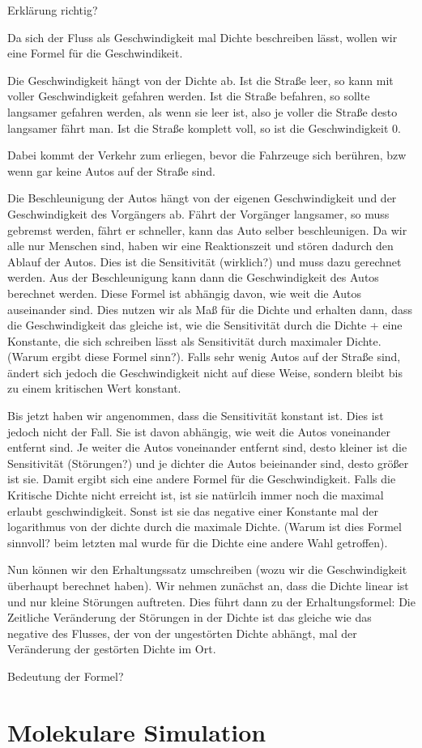 \documentclass[]{article}
\begin{document}
Erklärung richtig? 

Da sich der Fluss als Geschwindigkeit mal Dichte beschreiben lässt, wollen wir eine Formel für die Geschwindikeit. 

Die Geschwindigkeit hängt von der Dichte ab. Ist die Straße leer, so kann mit voller Geschwindigkeit gefahren werden. Ist die Straße befahren, so sollte langsamer gefahren werden, als wenn sie leer ist, also je voller die Straße desto langsamer fährt man. Ist die Straße komplett voll, so ist die Geschwindigkeit 0. 

Dabei kommt der Verkehr zum erliegen, bevor die Fahrzeuge sich berühren, bzw wenn gar keine Autos auf der Straße sind. 

Die Beschleunigung der Autos hängt von der eigenen Geschwindigkeit und der Geschwindigkeit des Vorgängers ab. Fährt der Vorgänger langsamer, so muss gebremst werden, fährt er schneller, kann das Auto selber beschleunigen. Da wir alle nur Menschen sind, haben wir eine Reaktionszeit und stören dadurch den Ablauf der Autos. Dies ist die Sensitivität (wirklich?) und muss dazu gerechnet werden. Aus der Beschleunigung kann dann die Geschwindigkeit des Autos berechnet werden. Diese Formel ist abhängig davon, wie weit die Autos auseinander sind. Dies nutzen wir als Maß für die Dichte und erhalten dann, dass die Geschwindigkeit das gleiche ist, wie die Sensitivität durch die Dichte + eine Konstante, die sich schreiben lässt als Sensitivität durch maximaler Dichte. (Warum ergibt diese Formel sinn?). Falls sehr wenig Autos auf der Straße sind, ändert sich jedoch die Geschwindigkeit nicht auf diese Weise, sondern bleibt bis zu einem kritischen Wert konstant. 

Bis jetzt haben wir angenommen, dass die Sensitivität konstant ist. Dies ist jedoch nicht der Fall. Sie ist davon abhängig, wie weit die Autos voneinander entfernt sind. Je weiter die Autos voneinander entfernt sind, desto kleiner ist die Sensitivität (Störungen?) und je dichter die Autos beieinander sind, desto größer ist sie. Damit ergibt sich eine andere Formel für die Geschwindigkeit. Falls die Kritische Dichte nicht erreicht ist, ist sie natürlcih immer noch die maximal erlaubt geschwindigkeit. Sonst ist sie das negative einer Konstante mal der logarithmus von der dichte durch die maximale Dichte.  (Warum ist dies Formel sinnvoll? beim letzten mal wurde für die Dichte eine andere Wahl getroffen). 

Nun können wir den Erhaltungssatz umschreiben (wozu wir die Geschwindigkeit überhaupt berechnet haben). Wir nehmen zunächst an, dass die Dichte linear ist und nur kleine Störungen auftreten. Dies führt dann zu der Erhaltungsformel: Die Zeitliche Veränderung der Störungen in der Dichte ist das gleiche wie das negative des Flusses, der von der ungestörten Dichte abhängt, mal der Veränderung der gestörten Dichte im Ort. 

Bedeutung der Formel? 



\section{Molekulare Simulation}

  
\end{document}
